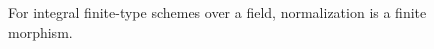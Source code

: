 \begin{figure}[htbp]\centering
{}
\caption{For integral finite-type schemes over a field, normalization is a finite morphism.}\label{fig:vi28-finite}\end{figure}
